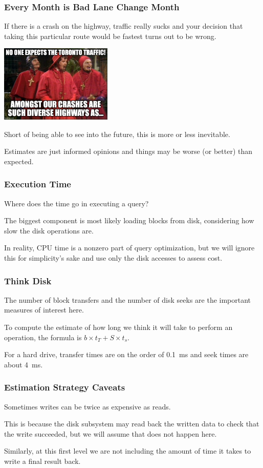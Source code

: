 \begin{frame}
\frametitle{Every Month is Bad Lane Change Month}

If there is a crash on the highway, traffic really sucks and your decision that taking this particular route would be fastest turns out to be wrong. 

\begin{center}
	\includegraphics[width=0.4\textwidth]{images/traffic.jpg}
\end{center}

Short of being able to see into the future, this is more or less inevitable.

Estimates are just informed opinions and things may be worse (or better) than expected. 

\end{frame}

\begin{frame}
\frametitle{Execution Time}

Where does the time go in executing a query? 

The biggest component is most likely loading blocks from disk, considering how slow the disk operations are. 

In reality, CPU time is a nonzero part of query optimization, but we will ignore this for simplicity's sake and use only the disk accesses to assess cost.

\end{frame}

\begin{frame}
\frametitle{Think Disk}

The number of block transfers and the number of disk seeks are the important measures of interest here.
 
To compute the estimate of how long we think it will take to perform an operation, the formula is $b \times t_{T} + S \times t_{s}$. 

For a hard drive, transfer times are on the order of 0.1~ms and seek times are about 4~ms.

\end{frame}

\begin{frame}
\frametitle{Estimation Strategy Caveats}

Sometimes writes can be twice as expensive as reads. 

This is because the disk subsystem may read back the written data to check that the write succeeded, but we will assume that does not happen here. 

Similarly, at this first level we are not including the amount of time it takes to write a final result back. 

\end{frame}

